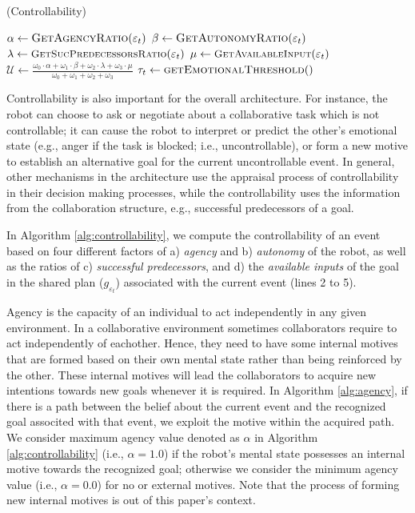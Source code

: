 \documentclass[letterpaper]{article}
\begin{document}
\begin{algorithm}
	\caption{(Controllability)}
	\label{alg:controllability}
	\begin{algorithmic}[1]
			\Statex
			\State $\alpha \gets \Call{GetAgencyRatio}{\varepsilon_t}$ 
			\State $\beta \gets \Call{GetAutonomyRatio}{\varepsilon_t}$
			\Statex
			\State $\lambda \gets
			\Call{\small{GetSucPredecessorsRatio}}{\varepsilon_t}$
			\State $\mu \gets
			\Call{\small{GetAvailableInput}}{\varepsilon_t}$
			\Statex
			\State $\mathcal{U} \gets
			\frac{\omega_{0}\cdot \alpha + \omega_{1}\cdot \beta + \omega_{2}\cdot
			\lambda + \omega_{3}\cdot \mu}{\omega_{0} + \omega_{1} + \omega_{2} +
			\omega_{3}}$
			\Statex
			\State $\tau_{t} \gets \Call{getEmotionalThreshold}{ }$
			\Statex
				\State {}
			\Else
				\State {}
			\EndIf
		\EndFunction
	\end{algorithmic}
\end{algorithm}

Controllability is also important for the overall architecture. For instance,
the robot can choose to ask or negotiate about a collaborative task which is
not controllable; it can cause the robot to interpret or predict the other's
emotional state (e.g., anger if the task is blocked; i.e., uncontrollable), or
form a new motive to establish an alternative goal for the current
uncontrollable event. In general, other mechanisms in the architecture use the
appraisal process of controllability in their decision making processes, while
the controllability uses the information from the collaboration structure,
e.g., successful predecessors of a goal.

In Algorithm \ref{alg:controllability}, we compute the controllability of an
event based on four different factors of a) \textit{agency} and b)
\textit{autonomy} of the robot, as well as the ratios of c) \textit{successful
predecessors}, and d) the \textit{available inputs} of the goal in the shared
plan ($\mathit{g}_{\varepsilon_t}$) associated with the current event (lines 2
to 5).

Agency is the capacity of an individual to act independently in any given
environment. In a collaborative environment sometimes collaborators require to
act independently of eachother. Hence, they need to have some internal motives
that are formed based on their own mental state rather than being reinforced by
the other. These internal motives will lead the collaborators to acquire new
intentions towards new goals whenever it is required. In Algorithm
\ref{alg:agency}, if there is a path between the belief about the current event
and the recognized goal associted with that event, we exploit the motive within
the acquired path. We consider maximum agency value denoted as $\alpha$ in
Algorithm \ref{alg:controllability} (i.e., $\alpha=1.0$) if the robot's mental
state possesses an internal motive towards the recognized goal; otherwise we
consider the minimum agency value (i.e., $\alpha=0.0$) for no or external
motives. Note that the process of forming new internal motives is out of this
paper's context.
\end{document}
